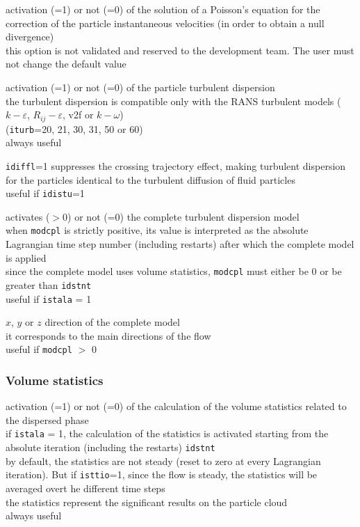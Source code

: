 {activation (=1) or not (=0) of the solution of a Poisson's equation for
the correction of the particle instantaneous velocities (in order to obtain a
null divergence)\\
this option is not validated and reserved to the development team. The user must not change
the default value}

{activation (=1) or not (=0) of the particle turbulent dispersion\\
the turbulent dispersion is compatible only with the RANS turbulent models
($k-\varepsilon$, $R_{ij}-\varepsilon$, v2f or $k-\omega$)\\
(\texttt{iturb}=20, 21, 30, 31, 50 or 60)\\
always useful}

{\texttt{idiffl}=1 suppresses the crossing trajectory effect, making
turbulent dispersion for the particles identical to the turbulent
diffusion of fluid particles\\
useful if \texttt{idistu}=1}

{activates ($>$0) or not (=0) the complete turbulent dispersion model\\
when \texttt{modcpl} is strictly positive, its value is interpreted as the
absolute Lagrangian time step number (including restarts) after which the
complete model is applied\\
since the complete model uses volume statistics, \texttt{modcpl} must
either be 0 or be greater than \texttt{idstnt}\\
useful if \texttt{istala} = 1}

{$x$, $y$ or $z$ direction of the complete model\\
it corresponds to the main directions of the flow\\
useful if \texttt{modcpl} $>$ 0}

\subsubsection{Volume statistics}

{activation (=1) or not (=0) of the calculation of the volume
statistics related to the dispersed phase\\
if \texttt{istala} = 1, the calculation of the statistics is activated
starting from the absolute iteration (including the restarts) \texttt{idstnt}\\
by default, the statistics are not steady (reset to zero at every
Lagrangian iteration). But if \texttt{isttio}=1, since the flow is steady,
the statistics will be averaged overt he different time steps\\
the statistics represent the significant results on the particle cloud\\
always useful}

